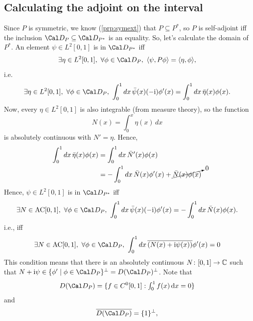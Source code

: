 \subsection{Calculating the adjoint on the interval}
Since \(P\) is symmetric, we know (\cref{prp:symext})
that \(P\subseteq P^{*}\), so \(P\) is self-adjoint iff the inclusion
\(\Cal D_P\subseteq \Cal D_{P^{*}}\) is an equality.
So, let's calculate the domain of \(P^*\).
An element \(\psi\in L^{2}[0,1]\) is in \(\Cal D_{P^{*}}\) iff
\begin{equation}
  \exists\eta\in L^{2}[0,1], \
  \forall\phi\in \Cal D_P, \
  \langle \psi, P\phi\rangle
  =
  \langle \eta, \phi\rangle,
\end{equation}
i.e.
\begin{equation}
  \exists\eta\in L^{2}[0,1], \
  \forall\phi\in \Cal D_P, \
  \int_{0}^{1}dx\, \bar\psi(x) (-\ic)\phi'(x)
  =
  \int_{0}^{1}dx\, \bar\eta(x) \phi(x).
\end{equation}
Now, every \(\eta\in L^{2}[0,1]\) is also integrable
(from measure theory),
so the function
\begin{equation}
  N(x) = \int_{0}^{x}\eta(x)\,dx
\end{equation}
is absolutely continuous with \(N'=\eta\). Hence,
\begin{align}
  \int_{0}^{1}dx\, \bar\eta(x) \phi(x)
  &= \int_{0}^{1}dx\, \bar N'(x) \phi(x) \\
  &= -\int_{0}^{1}dx\, \bar N(x) \phi'(x)
    + \cancelto{0}{\bar N(x)\phi(x)}
\end{align}
Hence, \(\psi\in L^{2}[0,1]\) is in \(\Cal D_{P^*}\) iff
\begin{equation}
  \exists N\in \AC[0,1], \
  \forall\phi\in \Cal D_P, \
  \int_{0}^{1}dx\, \bar\psi(x) (-\ic)\phi'(x)
  =
  -\int_{0}^{1}dx\, \bar N(x) \phi(x).
\end{equation}
i.e., iff
\begin{equation}
  \exists N\in \AC[0,1], \
  \forall\phi\in \Cal D_P, \
  \int_{0}^{1}dx\, \overline{(N(x)+\ic\psi(x))} \phi'(x)
  =0
\end{equation}
This condition means that there is an absolutely continuous
\(N\colon[0,1]\to\mathbb{C}\) such that \(N+\ic\psi \in \{\phi' \mid
\phi\in\Cal D_P\}^{\perp}=D(\Cal D_P)^{\perp}\).
Note that
\begin{equation}
  D(\Cal D_P) = \{f\in C^{0}[0,1] : \textstyle\int_{0}^{1}f(x)\d x=0\}
\end{equation}
and
\begin{equation}
  \overline{D(\Cal D_P)}
  = \{1\}^{\perp}
,\end{equation}
